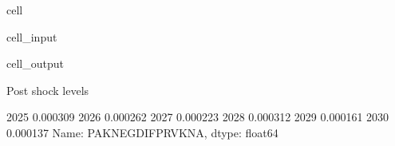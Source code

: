 \documentclass[letterpaper,10pt,english]{jupyterBook}
\begin{document}
\begin{sphinxuseclass}{cell}\begin{sphinxVerbatimInput}

\begin{sphinxuseclass}{cell_input}
\begin{sphinxVerbatim}[commandchars=\\\{\}]

\PYG{p}{[}\PYG{p}{]}
\end{sphinxVerbatim}

\end{sphinxuseclass}\end{sphinxVerbatimInput}
\begin{sphinxVerbatimOutput}

\begin{sphinxuseclass}{cell_output}
\begin{sphinxVerbatim}[commandchars=\\\{\}]
Post shock levels
\end{sphinxVerbatim}

\begin{sphinxVerbatim}[commandchars=\\\{\}]
2025   \PYGZhy{}0.000309
2026   \PYGZhy{}0.000262
2027   \PYGZhy{}0.000223
2028    0.000312
2029   \PYGZhy{}0.000161
2030   \PYGZhy{}0.000137
Name: PAKNEGDIFPRVKN\PYGZus{}A, dtype: float64
\end{sphinxVerbatim}

\end{sphinxuseclass}\end{sphinxVerbatimOutput}

\end{sphinxuseclass}
\end{document}
